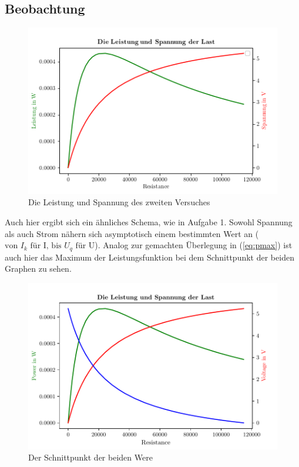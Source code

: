\documentclass{scrarticle}
\begin{document}
\subsection{Beobachtung}
\begin{figure}
  \begin{center}
  \includegraphics[scale=0.5]{pw_volt2.png}
  \caption{Die Leistung und Spannung des zweiten Versuches}
  \end{center}
\end{figure}
Auch hier ergibt sich ein ähnliches Schema, wie in Aufgabe 1. Sowohl Spannung als auch Strom nähern sich asymptotisch einem bestimmten Wert an ($\text{von }I_k\text{ für I, bis }U_q\text{ für U}$).
Analog zur gemachten Überlegung in (\ref{eq:pmax}) ist auch hier das Maximum der Leistungsfunktion bei dem Schnittpunkt der beiden Graphen zu sehen.
\begin{figure}
  \begin{center}
\includegraphics[scale=0.5]{pw_volt_rsjp2.pdf}
\caption{Der Schnittpunkt der beiden Were}
  \end{center}
\end{figure}
\end{document}
